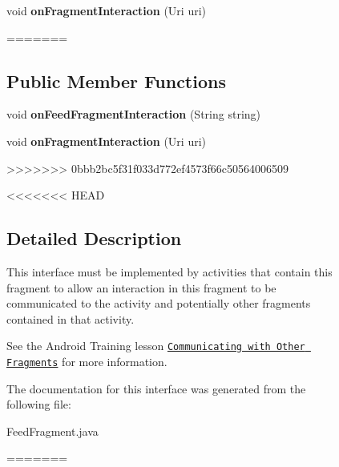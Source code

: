 \begin{figure}[H]
\begin{DoxyCompactItemize}
\item 
\hypertarget{interfacecom_1_1example_1_1sel_1_1lostfound_1_1FeedFragment_1_1OnFragmentInteractionListener_aeada926fa0dcf59d4b17dbe757d198ee}{void {\bfseries on\-Fragment\-Interaction} (Uri uri)}\label{interfacecom_1_1example_1_1sel_1_1lostfound_1_1FeedFragment_1_1OnFragmentInteractionListener_aeada926fa0dcf59d4b17dbe757d198ee}
=======
\subsection*{\-Public \-Member \-Functions}
\begin{DoxyCompactItemize}
\item 
\hypertarget{interfacecom_1_1example_1_1sel_1_1lostfound_1_1FeedFragment_1_1OnFragmentInteractionListener_a147ba47e242fae7f6095d672ab95d18a}{void {\bfseries on\-Feed\-Fragment\-Interaction} (\-String string)}\label{interfacecom_1_1example_1_1sel_1_1lostfound_1_1FeedFragment_1_1OnFragmentInteractionListener_a147ba47e242fae7f6095d672ab95d18a}

\item 
\hypertarget{interfacecom_1_1example_1_1sel_1_1lostfound_1_1FeedFragment_1_1OnFragmentInteractionListener_aeada926fa0dcf59d4b17dbe757d198ee}{void {\bfseries on\-Fragment\-Interaction} (\-Uri uri)}\label{interfacecom_1_1example_1_1sel_1_1lostfound_1_1FeedFragment_1_1OnFragmentInteractionListener_aeada926fa0dcf59d4b17dbe757d198ee}
>>>>>>> 0bbb2bc5f31f033d772ef4573f66c50564006509

\end{DoxyCompactItemize}


<<<<<<< HEAD
\subsection{Detailed Description}
This interface must be implemented by activities that contain this fragment to allow an interaction in this fragment to be communicated to the activity and potentially other fragments contained in that activity. 

See the Android Training lesson \href{http://developer.android.com/training/basics/fragments/communicating.html}{\tt Communicating with Other Fragments} for more information. 

The documentation for this interface was generated from the following file\-:\begin{DoxyCompactItemize}
\item 
Feed\-Fragment.\-java\end{DoxyCompactItemize}
=======

\end{DoxyCompactItemize}
\end{figure}
